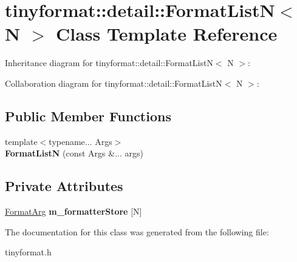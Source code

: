\hypertarget{classtinyformat_1_1detail_1_1FormatListN}{}\section{tinyformat\+:\+:detail\+:\+:Format\+ListN$<$ N $>$ Class Template Reference}
\label{classtinyformat_1_1detail_1_1FormatListN}


Inheritance diagram for tinyformat\+:\+:detail\+:\+:Format\+ListN$<$ N $>$\+:


Collaboration diagram for tinyformat\+:\+:detail\+:\+:Format\+ListN$<$ N $>$\+:
\subsection*{Public Member Functions}
\begin{DoxyCompactItemize}
\item 
\mbox{\label{classtinyformat_1_1detail_1_1FormatListN_a57588eecfd6402f5650960f6a7f58d2c}} 
{\footnotesize template$<$typename... Args$>$ }\\{\bfseries Format\+ListN} (const Args \&... args)
\end{DoxyCompactItemize}
\subsection*{Private Attributes}
\begin{DoxyCompactItemize}
\item 
\mbox{\label{classtinyformat_1_1detail_1_1FormatListN_a34d9e64988d50f945f6bbef71429f35f}} 
\mbox{\hyperlink{classtinyformat_1_1detail_1_1FormatArg}{Format\+Arg}} {\bfseries m\+\_\+formatter\+Store} \mbox{[}N\mbox{]}
\end{DoxyCompactItemize}


The documentation for this class was generated from the following file\+:\begin{DoxyCompactItemize}
\item 
tinyformat.\+h\end{DoxyCompactItemize}
